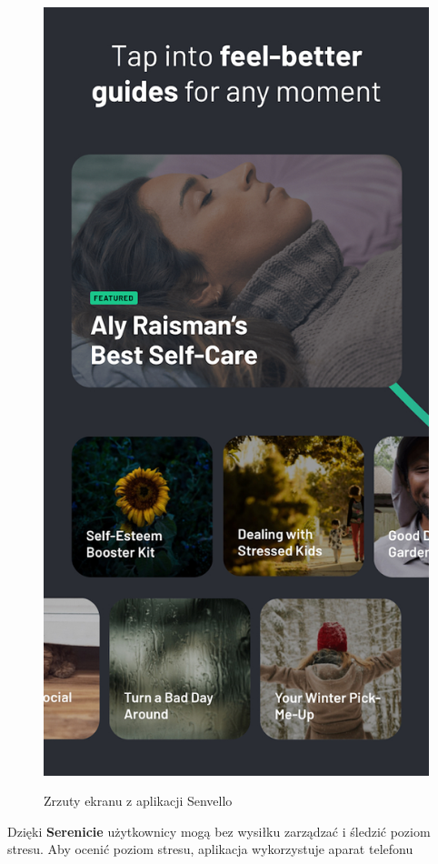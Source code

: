\begin{figure}[h]
{{            \includegraphics[]{img/senvello2.jpg}
        } }
    \caption{Zrzuty ekranu z aplikacji Senvello}
\end{figure}
Dzięki \textbf{Serenicie} użytkownicy mogą bez wysiłku zarządzać i śledzić
poziom stresu. Aby ocenić poziom stresu, aplikacja wykorzystuje aparat telefonu
